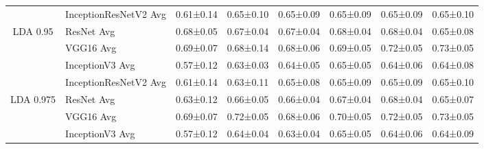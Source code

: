 \begin{landscape}
\begin{table}[]
\begin{tabular}{clllllll}
                            & InceptionResNetV2 Avg              & 0.61±0.14                                  & 0.65±0.10                         & 0.65±0.09                         & 0.65±0.09                         & 0.65±0.09                         & 0.65±0.10                         \\
\multirow{-4}{*}{LDA 0.95}  & ResNet Avg                         & 0.68±0.05                                  & 0.67±0.04                         & 0.67±0.04                         & 0.68±0.04                         & 0.68±0.04                         & 0.65±0.08                         \\
                            & VGG16 Avg                          & 0.69±0.07                                  & 0.68±0.14                         & 0.68±0.06                         & 0.69±0.05                         & 0.72±0.05                         & 0.73±0.05                         \\
                            & InceptionV3 Avg                    & 0.57±0.12                                  & 0.63±0.03                         & 0.64±0.05                         & 0.65±0.05                         & 0.64±0.06                         & 0.64±0.08                         \\
                            & InceptionResNetV2 Avg              & 0.61±0.14                                  & 0.63±0.11                         & 0.65±0.08                         & 0.65±0.09                         & 0.65±0.09                         & 0.65±0.10                         \\
\multirow{-4}{*}{LDA 0.975} & ResNet Avg                         & 0.63±0.12                                  & 0.66±0.05                         & 0.66±0.04                         & 0.67±0.04                         & 0.68±0.04                         & 0.65±0.07                         \\
                            & VGG16 Avg                          & 0.69±0.07                                  & 0.72±0.05                         & 0.68±0.06                         & 0.70±0.05                         & 0.72±0.05                         & 0.73±0.05                         \\
                            & InceptionV3 Avg                    & 0.57±0.12                                  & 0.64±0.04                         & 0.63±0.04                         & 0.65±0.05                         & 0.64±0.06                         & 0.64±0.09                         \\

\end{tabular}
\end{table}
\end{landscape}
